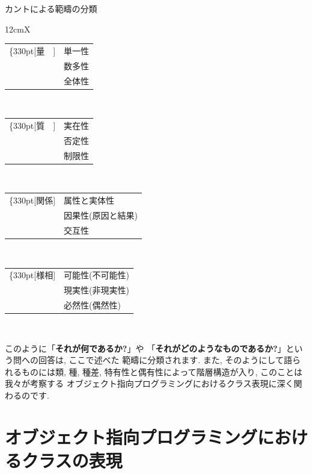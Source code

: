 \begin{itembox}[c]{カントによる範疇の分類}
{\footnotesize
\begin{tabularx}{12cm}{X}
\begin{tabular}[t]{rl}
\ldelim\{{3}{30pt}[量　]&
単一性\\
&数多性\\
&全体性\\
\end{tabular}
\\
\begin{tabular}[t]{rl}
\ldelim\{{3}{30pt}[質　]&
実在性\\
&否定性\\
&制限性\\
\end{tabular}
\\
\begin{tabular}[t]{rl}
\ldelim\{{3}{30pt}[関係]&
属性と実体性\\
&因果性(原因と結果)\\
&交互性\\
\end{tabular}
\\
\begin{tabular}[t]{rl}
\ldelim\{{3}{30pt}[様相]&
可能性(不可能性)\\
&現実性(非現実性)\\
&必然性(偶然性)\\
\end{tabular}
\\
\end{tabularx}
}
\end{itembox}


このように「\textbf{それが何であるか?}」や
「\textbf{それがどのようなものであるか?}」という問への回答は, ここで述べた
範疇に分類されます. また, そのようにして語られるものには類, 種, 種差,
 特有性と偶有性によって階層構造が入り, このことは我々が考察する
オブジェクト指向プログラミングにおけるクラス表現に深く関わるのです.

\section{オブジェクト指向プログラミングにおけるクラスの表現}



